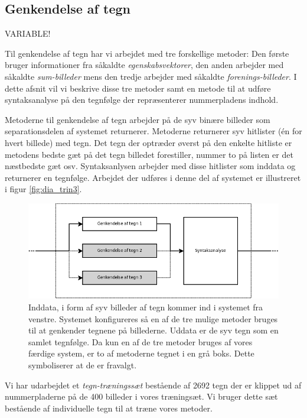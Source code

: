 \subsection{Genkendelse af tegn}
\label{sec_monster}

VARIABLE!

Til genkendelse af tegn har vi arbejdet med tre forskellige metoder: Den første bruger informationer fra såkaldte \textit{egenskabsvektorer}, den anden arbejder med såkaldte \textit{sum-billeder} mens den tredje arbejder med såkaldte \textit{forenings-billeder}. I dette afsnit vil vi beskrive disse tre metoder samt en metode til at udføre syntaksanalyse på den tegnfølge der repræsenterer nummerpladens indhold.

Metoderne til genkendelse af tegn arbejder på de syv binære billeder som separationsdelen af systemet returnerer. Metoderne returnerer syv hitlister (én for hvert billede) med tegn. Det tegn der optræder øverst på den enkelte hitliste er metodens bedste gæt på det tegn billedet forestiller, nummer to på listen er det næstbedste gæt osv. Syntaksanlysen arbejder med disse hitlister som inddata og returnerer en tegnfølge. Arbejdet der udføres i denne del af systemet er illustreret i figur \vref{fig:dia_trin3}.

\begin{figure}[htp]
\centering
\includegraphics[width=12cm]{system/illu/dia_trin3.png} 
\caption{Inddata, i form af syv billeder af tegn kommer ind i systemet fra venstre. Systemet konfigureres så en af de tre mulige metoder bruges til at genkender tegnene på billederne. Uddata er de syv tegn som en samlet tegnfølge. Da kun en af de tre metoder bruges af vores færdige system, er to af metoderne tegnet i en grå boks. Dette symboliserer at de er fravalgt.}
\label{fig:dia_trin3}
\end{figure}

Vi har udarbejdet et \textit{tegn-træningssæt} bestående af 2692 tegn der er klippet ud af nummerpladerne på de 400 billeder i vores træningsæt. Vi bruger dette sæt bestående af individuelle tegn til at træne vores metoder.

